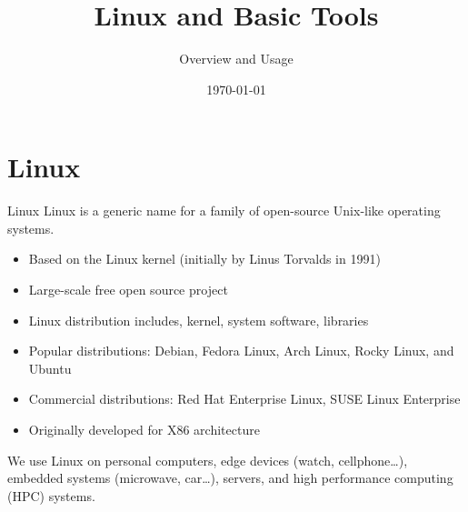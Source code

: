 \documentclass{setbeamer}
\title{Linux and Basic Tools}
\subtitle{Overview and Usage}
\institute{\theChairName\\\theDepartmentName\\\theUniversityName}
\date[\today]{\today}
\begin{document}
 
\maketitle

\section{Linux}

\begin{frame}{Linux}
    Linux is a generic name for a family of open-source Unix-like operating systems.\\

    \begin{itemize}
        \item Based on the Linux kernel (initially by Linus Torvalds in 1991)
        \item Large-scale free open source project
        \item Linux distribution includes, kernel, system software, libraries
        \item Popular distributions:  Debian, Fedora Linux, Arch Linux, Rocky Linux, and Ubuntu
        \item Commercial distributions: Red Hat Enterprise Linux, SUSE Linux Enterprise
        \item Originally developed for X86 architecture
    \end{itemize}
    \vspace{0.3cm}

	We use Linux on personal computers, edge devices (watch, cellphone\dots ), embedded systems (microwave, car\dots), servers, and high performance computing (HPC) systems.
\end{frame}
\end{document}
